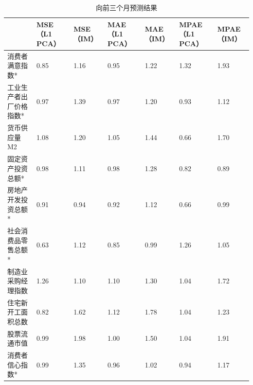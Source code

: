 \begin{table}[H]
    \small
    \centering
    \caption{向前三个月预测结果}
    \label{outcome2}
    \begin{tabularx}{\textwidth}{lXXXXXX}
    \toprule
                 &  MSE（L1 PCA） &  MSE（IM） &  MAE（L1 PCA） &  MAE（IM） &  MPAE（L1 PCA） &  MPAE（IM） \\ \midrule
                 消费者满意指数*     & 0.85            & 1.16        & 0.95            & 1.22        & 1.32             & 1.93         \\
    工业生产者出厂价格指数* & 0.97            & 1.39        & 0.97            & 1.20        & 0.93             & 1.12         \\
    货币供应量M2       & 1.08            & 1.20        & 1.05            & 1.44        & 0.66             & 1.70         \\
    固定资产投资总额*  & 0.98            & 1.11        & 0.98            & 1.28        & 0.82             & 0.89         \\
    房地产开发投资总额* & 0.91            & 0.94        & 0.92            & 1.12        & 0.66             & 0.99         \\
    社会消费品零售总额* & 0.63            & 1.12        & 0.85            & 0.99        & 1.26             & 1.05         \\
    制造业采购经理指数    & 1.26            & 1.10        & 1.10            & 1.30        & 1.04             & 1.72         \\
    住宅新开工面积总数   & 0.82            & 1.62        & 1.12            & 1.78        & 1.04             & 1.23         \\
    股票流通市值   & 0.99            & 1.98        & 1.00            & 1.50        & 1.04             & 1.91         \\
    消费者信心指数*     & 0.99            & 1.35        & 0.96            & 1.02        & 0.94             & 1.17         \\ \bottomrule
    \end{tabularx}
\end{table}

